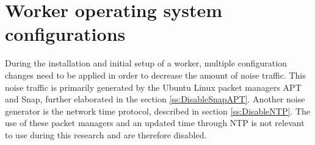 \section{Worker operating system configurations}
\label{s:WorkerOSConfiguration}
During the installation and initial setup of a worker, multiple configuration changes need to be applied in order to decrease the amount of noise traffic.
This noise traffic is primarily generated by the Ubuntu Linux packet managers APT and Snap, further elaborated in the section \ref{ss:DisableSnapAPT}.
Another noise generator is the network time protocol, described in section \ref{ss:DisableNTP}.
The use of these packet managers and an updated time through NTP is not relevant to use during this research and are therefore disabled.








